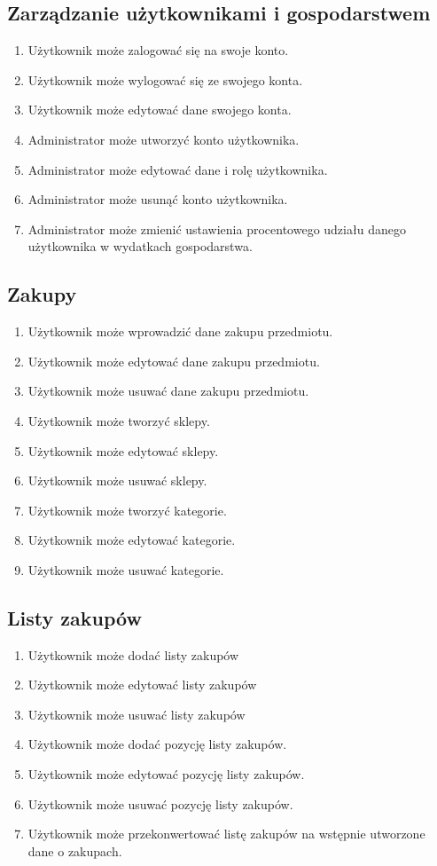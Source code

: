 \subsection{Zarządzanie użytkownikami i gospodarstwem}

\begin{enumerate}
    \item Użytkownik może zalogować się na swoje konto.
    \item Użytkownik może wylogować się ze swojego konta.
    \item Użytkownik może edytować dane swojego konta.
    \item Administrator może utworzyć konto użytkownika.
    \item Administrator może edytować dane i rolę użytkownika.
    \item Administrator może usunąć konto użytkownika.
    \item Administrator może zmienić ustawienia procentowego udziału danego użytkownika w wydatkach gospodarstwa.
\end{enumerate}
    
\subsection{Zakupy}

\begin{enumerate}
    \item Użytkownik może wprowadzić dane zakupu przedmiotu.
    \item Użytkownik może edytować dane zakupu przedmiotu.
    \item Użytkownik może usuwać dane zakupu przedmiotu.
    \item Użytkownik może tworzyć sklepy.
    \item Użytkownik może edytować sklepy.
    \item Użytkownik może usuwać sklepy.
    \item Użytkownik może tworzyć kategorie.
    \item Użytkownik może edytować kategorie.
    \item Użytkownik może usuwać kategorie.
\end{enumerate}

\subsection{Listy zakupów}

\begin{enumerate}
    \item Użytkownik może dodać listy zakupów
    \item Użytkownik może edytować listy zakupów
    \item Użytkownik może usuwać listy zakupów
    \item Użytkownik może dodać pozycję listy zakupów.
    \item Użytkownik może edytować pozycję listy zakupów.
    \item Użytkownik może usuwać pozycję listy zakupów.
    \item Użytkownik może przekonwertować listę zakupów na wstępnie utworzone dane o zakupach.
\end{enumerate}

